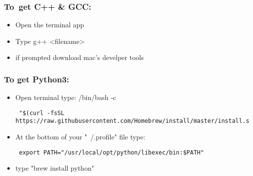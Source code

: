   \subsubsection*{To\ get C++ & GCC:}
    \begin{itemize}
      \item Open the terminal app
      \item Type g++ <filename>
      \item if prompted download mac's develper tools
    \end{itemize}
  \subsubsection*{To get Python3:}
    \begin{itemize}
      \item Open terminal type: /bin/bash -c \begin{verbatim} "$(curl -fsSL https://raw.githubusercontent.com/Homebrew/install/master/install.sh)" \end{verbatim}
      \item At the bottom of your "~/.profile" file  type: \begin{verbatim} export PATH="/usr/local/opt/python/libexec/bin:$PATH" \end{verbatim}
      \item type "brew install python"
    \end{itemize}
